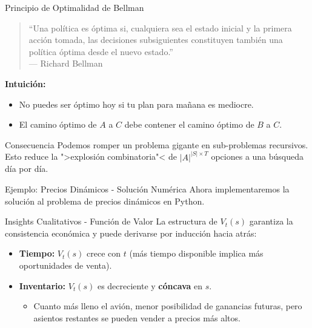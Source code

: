 \documentclass[xcolor=dvipsnames]{beamer}
\begin{document}
\begin{frame}{Principio de Optimalidad de Bellman}
\begin{quote}
   “Una política es óptima si, cualquiera sea el estado inicial y la primera acción tomada, las decisiones subsiguientes constituyen también una política óptima desde el nuevo estado.”\\
    \flushright --- Richard Bellman
\end{quote}

\textbf{Intuici\'on:}
\begin{itemize}
    \item No puedes ser óptimo hoy si tu plan para mañana es mediocre.
    \item El camino óptimo de $A$ a $C$ debe contener el camino óptimo de $B$ a $C$.
\end{itemize}

\begin{alertblock}{Consecuencia}
    Podemos romper un problema gigante en sub-problemas recursivos. Esto reduce la ">explosi\'on combinatoria"< de $|A|^{|S| \times T}$ opciones a una b\'usqueda d\'ia por d\'ia.
\end{alertblock}
\end{frame}

\begin{frame}{Ejemplo: Precios Din\'amicos - Soluci\'on Num\'erica}
Ahora implementaremos la soluci\'on al problema de precios din\'amicos en Python.
\end{frame}

\begin{frame}{Insights Cualitativos - Funci\'on de Valor}
La estructura de $V_t(s)$ garantiza la consistencia econ\'omica y puede derivarse por inducci\'on hacia atr\'as:

\begin{itemize}
    \item \textbf{Tiempo:} $V_t(s)$ crece con $t$ (m\'as tiempo disponible implica m\'as oportunidades de venta).
    \item \textbf{Inventario:} $V_t(s)$ es decreciente y \textbf{c\'oncava} en $s$.
    \begin{itemize}
        \item Cuanto m\'as lleno el avi\'on, menor posibilidad de ganancias futuras, pero asientos restantes se pueden vender a precios m\'as altos.
    \end{itemize}
\end{itemize}
\end{frame}
\end{document}
